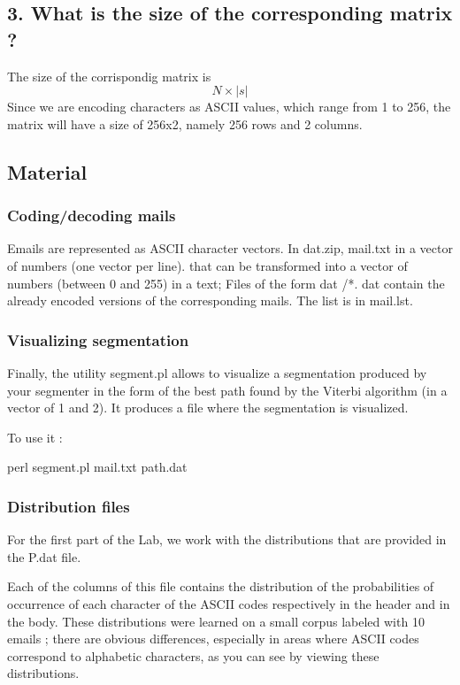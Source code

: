 \documentclass[11pt]{article}
\begin{document}
\subsection{3. What is the size of the corresponding matrix
?}\label{what-is-the-size-of-the-corresponding-matrix}

The size of the corrispondig matrix is \[ N \times |s| \] Since we are
encoding characters as ASCII values, which range from 1 to 256, the
matrix will have a size of 256x2, namely 256 rows and 2 columns.

\subsection{Material}\label{material}

\subsubsection{Coding/decoding mails}\label{codingdecoding-mails}

Emails are represented as ASCII character vectors. In dat.zip, mail.txt
in a vector of numbers (one vector per line). that can be transformed
into a vector of numbers (between 0 and 255) in a text; Files of the
form dat /*. dat contain the already encoded versions of the
corresponding mails. The list is in mail.lst.

\subsubsection{Visualizing segmentation}\label{visualizing-segmentation}

Finally, the utility segment.pl allows to visualize a segmentation
produced by your segmenter in the form of the best path found by the
Viterbi algorithm (in a vector of 1 and 2). It produces a file where the
segmentation is visualized.

To use it :

perl segment.pl mail.txt path.dat

\subsubsection{Distribution files}\label{distribution-files}

For the first part of the Lab, we work with the distributions that are
provided in the P.dat file.

Each of the columns of this file contains the distribution of the
probabilities of occurrence of each character of the ASCII codes
respectively in the header and in the body. These distributions were
learned on a small corpus labeled with 10 emails ; there are obvious
differences, especially in areas where ASCII codes correspond to
alphabetic characters, as you can see by viewing these distributions.
\end{document}
